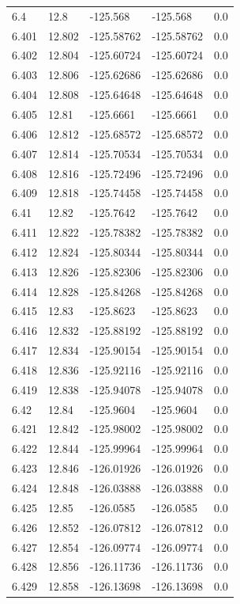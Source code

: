 \begin{tabular}{lllll}
6.4 & 12.8 & -125.568 & -125.568 & 0.0 \\
6.401 & 12.802 & -125.58762 & -125.58762 & 0.0 \\
6.402 & 12.804 & -125.60724 & -125.60724 & 0.0 \\
6.403 & 12.806 & -125.62686 & -125.62686 & 0.0 \\
6.404 & 12.808 & -125.64648 & -125.64648 & 0.0 \\
6.405 & 12.81 & -125.6661 & -125.6661 & 0.0 \\
6.406 & 12.812 & -125.68572 & -125.68572 & 0.0 \\
6.407 & 12.814 & -125.70534 & -125.70534 & 0.0 \\
6.408 & 12.816 & -125.72496 & -125.72496 & 0.0 \\
6.409 & 12.818 & -125.74458 & -125.74458 & 0.0 \\
6.41 & 12.82 & -125.7642 & -125.7642 & 0.0 \\
6.411 & 12.822 & -125.78382 & -125.78382 & 0.0 \\
6.412 & 12.824 & -125.80344 & -125.80344 & 0.0 \\
6.413 & 12.826 & -125.82306 & -125.82306 & 0.0 \\
6.414 & 12.828 & -125.84268 & -125.84268 & 0.0 \\
6.415 & 12.83 & -125.8623 & -125.8623 & 0.0 \\
6.416 & 12.832 & -125.88192 & -125.88192 & 0.0 \\
6.417 & 12.834 & -125.90154 & -125.90154 & 0.0 \\
6.418 & 12.836 & -125.92116 & -125.92116 & 0.0 \\
6.419 & 12.838 & -125.94078 & -125.94078 & 0.0 \\
6.42 & 12.84 & -125.9604 & -125.9604 & 0.0 \\
6.421 & 12.842 & -125.98002 & -125.98002 & 0.0 \\
6.422 & 12.844 & -125.99964 & -125.99964 & 0.0 \\
6.423 & 12.846 & -126.01926 & -126.01926 & 0.0 \\
6.424 & 12.848 & -126.03888 & -126.03888 & 0.0 \\
6.425 & 12.85 & -126.0585 & -126.0585 & 0.0 \\
6.426 & 12.852 & -126.07812 & -126.07812 & 0.0 \\
6.427 & 12.854 & -126.09774 & -126.09774 & 0.0 \\
6.428 & 12.856 & -126.11736 & -126.11736 & 0.0 \\
6.429 & 12.858 & -126.13698 & -126.13698 & 0.0 \\

\end{tabular}
